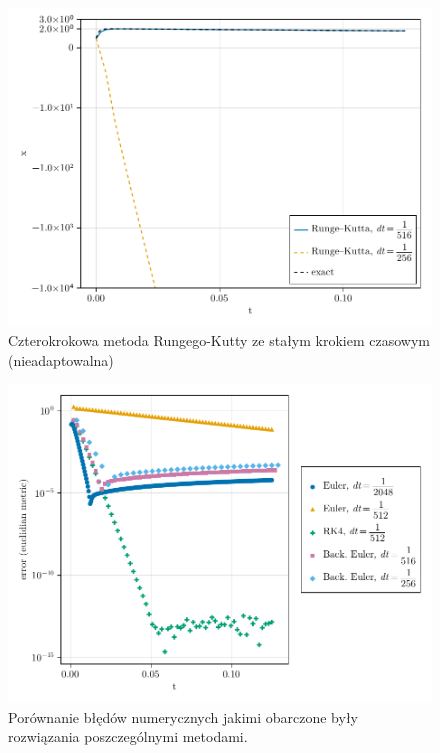 \documentclass[12pt]{article}
\begin{document}
\begin{figure}
\centering
\includegraphics[width=\textwidth]{RK-methods}
\caption{Czterokrokowa metoda Rungego-Kutty ze stałym krokiem czasowym (nieadaptowalna)}
\end{figure}

\begin{figure}
\centering
\includegraphics[width=\textwidth]{method-errors}
\caption{Porównanie błędów numerycznych jakimi obarczone były rozwiązania poszczególnymi metodami.}
\end{figure}
\end{document}
